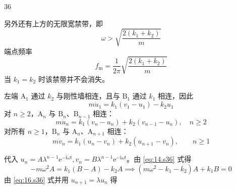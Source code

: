 \begin{solution}{36}
\begin{subsolution}
\begin{subsubsolution}
            另外还有上方的无限宽禁带，即
            \begin{equation}
                \omega > \sqrt {\frac {2 (k _ {1} + k _ {2})}{m}}
                \label{eq:12.s36}
            \end{equation}
            端点频率
            \begin{equation}
                f _ {\mathrm{m}} = \frac {1}{2 \pi} \sqrt {\frac {2 (k _ {1} + k _ {2})}{m}}
                \label{eq:13.s36}
            \end{equation}
            当 $k_{1} = k_{2}$ 时该禁带并不会消失。
        \end{subsubsolution}
    \end{subsolution}
    \begin{subsolution}
        \begin{subsubsolution}
            左端 $\mathrm{A}_1$ 通过 $k_{2}$ 与刚性墙相连，且与 $\mathrm{B}_1$ 通过 $k_{1}$ 相连，因此
            \begin{equation}
                m \ddot {u} _ {1} = k _ {1} (v _ {1} - u _ {1}) - k _ {2} u _ {1}
                \label{eq:14.s36}
            \end{equation}
            对 $n \geq 2$，$\mathrm{A}_n$ 与 $\mathrm{B}_n$、$\mathrm{B}_{n-1}$ 相连：
            \begin{equation}
                m \ddot {u} _ {n} = k _ {1} (v _ {n} - u _ {n}) + k _ {2} (v _ {n - 1} - u _ {n}), \quad n \geq 2
                \label{eq:15.s36}
            \end{equation}
            对所有 $n \geq 1$，$\mathrm{B}_n$ 与 $\mathrm{A}_n$、$\mathrm{A}_{n+1}$ 相连：
            \begin{equation}
                m \ddot {v} _ {n} = k _ {1} (u _ {n} - v _ {n}) + k _ {2} (u _ {n + 1} - v _ {n}), \qquad n \geq 1
                \label{eq:16.s36}
            \end{equation}
        \end{subsubsolution}
        \begin{subsubsolution}
            代入 $u_{n} = A\lambda^{n - 1}\mathrm{e}^{-\mathrm{i}\omega t}, v_{n} = B\lambda^{n - 1}\mathrm{e}^{-\mathrm{i}\omega t}$。由 \eqref{eq:14.s36} 式得
            \begin{equation}
                - m \omega^ {2} A = k _ {1} (B - A) - k _ {2} A \implies (m \omega^ {2} - k _ {1} - k _ {2}) A + k _ {1} B = 0
                \label{eq:17.s36}
            \end{equation}
            由 \eqref{eq:16.s36} 式并用 $u_{n+1} = \lambda u_n$ 得

\end{subsubsolution}
\end{subsolution}
\end{solution}
